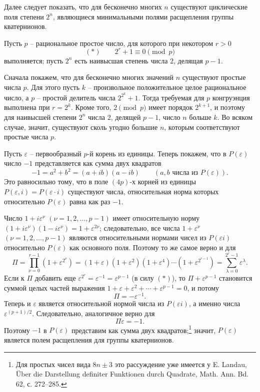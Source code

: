 \documentclass[11pt]{article}
\begin{document}
\noindent Далее следует показать, что для бесконечно многих $n$ существуют циклические поля степени $2^n$, являющиеся минимальными полями расщепления группы кватернионов.

\medskip

\noindent Пусть $p$ -- рациональное простое число, для которого при некотором $r>0$
\[
        (*)\qquad 2^r+1\equiv0\pmod p
\]
выполняется; пусть $2^n$ есть наивысшая степень числа $2$, делящая $p-1$.

Сначала покажем, что для бесконечно многих значений $n$ существуют простые числа $p$. Для этого пусть $k$ -- произвольное положительное целое рациональное число, а $p$ -- простой делитель числа $2^{2^k}+1$. Тогда требуемая для $p$ конгруэнция выполнена при $r=2^k$. Кроме того, $2\pmod p$ имеет порядок $2^{k+1}$, и поэтому для наивысшей степени $2^n$ числа $2$, делящей $p-1$, число $n$ больше $k$. Во всяком случае, значит, существуют сколь угодно большие $n$, которым соответствуют простые числа $p$.

Пусть $\varepsilon$ -- первообразный $p$-й корень из единицы. Теперь покажем, что в $P(\varepsilon)$ число $-1$ представляется как сумма двух квадратов
\[
        -1=a^2+b^2=(a+ib)(a-ib)\qquad (a,b\text{ числа из }P(\varepsilon)).
\]
Это равносильно тому, что в поле $(4p)$-х корней из единицы $P(\varepsilon,i)=P(\varepsilon\cdot i)$ существуют числа, относительная норма которых относительно $P(\varepsilon)$ равна как раз $-1$.

Число $1+i\varepsilon^\nu$ $(\nu=1,2,\ldots,p-1)$ имеет относительную норму $(1+i\varepsilon^\nu)(1-i\varepsilon^\nu)=1+\varepsilon^{2\nu}$; следовательно, все числа $1+\varepsilon^\nu$ $(\nu=1,2,\ldots,p-1)$ являются относительными нормами чисел из $P(\varepsilon i)$ относительно $P(\varepsilon)$ как основного поля. Поэтому то же самое верно и для
\[
\Pi=\prod_{\nu=0}^{r-1}(1+\varepsilon^{2^\nu})
=(1+\varepsilon)(1+\varepsilon^2)(1+\varepsilon^4)\cdots(1+\varepsilon^{2^{r-1}})
=\sum_{\lambda=0}^{2^r-1}\varepsilon^\lambda.
\]
Если к $\Pi$ добавить еще $\varepsilon^{2^r}=\varepsilon^{-1}=\varepsilon^{p-1}$ (в силу $(*)$), то $\Pi+\varepsilon^{p-1}$ становится суммой целых частей выражения $1+\varepsilon+\varepsilon^2+\cdots+\varepsilon^{p-1}=0$, и потому
\[
        \Pi=-\varepsilon^{-1}.
\]
Теперь и $\varepsilon$ является относительной нормой числа из $P(\varepsilon i)$, а именно числа $\varepsilon^{(p+1)/2}$. Следовательно, аналогичное верно для
\[
        \Pi\varepsilon=-1.
\]
Поэтому $-1$ в $P(\varepsilon)$ представим как сумма двух квадратов;\footnote{Для простых чисел вида $8n\pm3$ это рассуждение уже имеется у E. Landau, Über die Darstellung definiter Funktionen durch Quadrate, Math. Ann. Bd. 62, с. 272--285.} значит, $P(\varepsilon)$ является полем расщепления для группы кватернионов.
\end{document}
